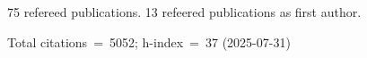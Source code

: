 75 refereed publications. 13 refeered publications as first author.

Total citations~=~5052; h-index~=~37 (2025-07-31)